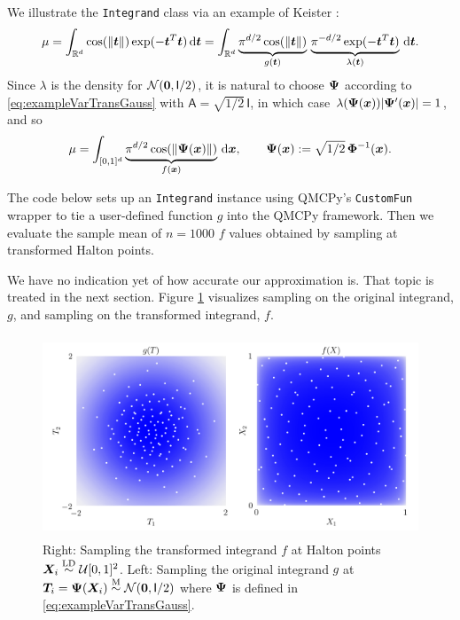 \documentclass[graybox,footinfo]{svmult}
\newcommand{\QMCPYabs}[1]{\ensuremath{{\left \lvert #1 \right \rvert}}}
\newcommand{\LD}{\textup{LD}}
\newcommand{\LDsim}{\overset{\LD}{\sim}}
\newcommand{\Msim}{\overset{\textup{M}}{\sim}}
\newcommand{\mA}{\mathsf{A}}
\newcommand{\mI}{\mathsf{I}}
\begin{document}
We illustrate the \texttt{Integrand} class via an example of Keister \cite{Kei96}:
\begin{equation} \label{eq:KeisterIntegral}
	\mu 
	= \int_{\bbR^d} \cos(\lVert \bst \rVert) \exp(-\bst^T \bst) \, \D \bst \\ 
	= \int_{\bbR^d} \underbrace{\pi^{d/2} \cos(\lVert \bst \rVert)}_{g(\bst)}\, \underbrace{\pi^{-d/2} \exp(-\bst^T \bst) }_{\lambda(\bst)} \, \D \bst.
\end{equation}
Since $\lambda$ is the density for $\calN(\bszero,\mI/2)$, it is natural to choose ${\boldsymbol{\Psi}}$ according to \eqref{eq:exampleVarTransGauss} with $\mA = \sqrt{1/2} \, \mI$, in which case $\lambda(\bsPsi(\bsx)) \QMCPYabs{\bsPsi'(\bsx)}  = 1$, and so 
\[
\mu = \int_{[0,1]^d} \underbrace{\pi^{d/2} \cos(\lVert {\boldsymbol{\Psi}}({\boldsymbol{x}}) \rVert)}_{f({\boldsymbol{x}})} \, \mathrm{d} {\boldsymbol{x}}, \qquad 
{\boldsymbol{\Psi}}({\boldsymbol{x}}) := \sqrt{1/2} \,{\boldsymbol{\Phi}}^{-1}({\boldsymbol{x}}).
\]

The code below sets up an \texttt{Integrand} instance using QMCPy's \texttt{CustomFun} wrapper to tie a user-defined function $g$ into the QMCPy framework.  Then we evaluate the sample mean of $n=1000$ $f$ values obtained by sampling at transformed Halton points.

We have no indication yet of how accurate our approximation is.  That topic is treated in the next section.  Figure \ref{fig:ikc} visualizes sampling on the original integrand, $g$, and sampling on the transformed integrand, $f$. 

\begin{figure}[t]
	\includegraphics[height=6cm]{QMCSoftwareArticle/figs/i_keister_contours.png}
	\caption{Right: Sampling the transformed integrand $f$ at Halton points $\bsX_i \LDsim \calU[0,1]^2$. Left: Sampling the original integrand $g$ at $\bsT_i = \bsPsi(\bsX_i) \Msim \calN(\bszero,\mI/2)$ where ${\boldsymbol{\Psi}}$ is defined in \eqref{eq:exampleVarTransGauss}.  } \label{fig:ikc}
\end{figure}
\end{document}
